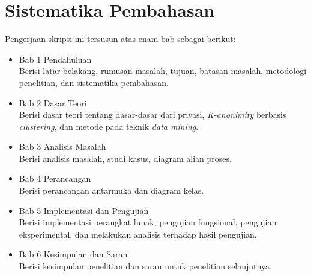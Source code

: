 \section{Sistematika Pembahasan}
\label{sec:sispem}
Pengerjaan skripsi ini tersusun atas enam bab sebagai berikut:
\begin{itemize}
\item Bab 1 Pendahuluan\\
Berisi latar belakang, rumusan masalah, tujuan, batasan masalah, metodologi penelitian, dan sistematika pembahasan.
\item Bab 2 Dasar Teori\\
Berisi dasar teori tentang dasar-dasar dari privasi, {\it K-anonimity} berbasis {\it clustering}, dan metode pada teknik {\it data mining}.
\item Bab 3 Analisis Masalah\\
Berisi analisis masalah, studi kasus, diagram alian proses.
\item Bab 4 Perancangan \\
Berisi perancangan antarmuka dan diagram kelas.
\item Bab 5 Implementasi dan Pengujian\\
Berisi implementasi perangkat lunak, pengujian fungsional, pengujian eksperimental, dan melakukan analisis terhadap hasil pengujian.
\item Bab 6 Kesimpulan dan Saran\\
Berisi kesimpulan penelitian dan saran untuk penelitian selanjutnya.
\end{itemize}
